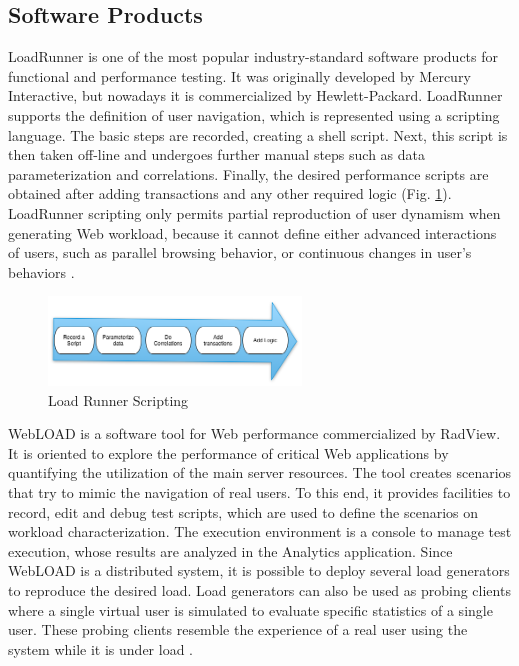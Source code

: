 \documentclass[espaco=umemeio,chapter=TITLE,twoside,openright]{abnt}
\begin{document}
\subsection{Software Products}

LoadRunner is one of the most popular industry-standard software products for functional and performance testing. It was originally developed by Mercury Interactive, but nowadays it is commercialized by Hewlett-Packard. LoadRunner supports the definition of user navigation, which is represented using a scripting language. The basic steps are recorded, creating a shell script. Next, this script is then taken off-line and undergoes further manual steps such as data parameterization and correlations. Finally, the desired performance scripts are obtained after adding transactions and any other required logic (Fig. \ref{fig:loadrunner}). LoadRunner scripting only permits partial reproduction of user dynamism when generating Web workload, because it cannot define either advanced interactions of users, such as parallel browsing behavior, or continuous changes in user’s behaviors \cite{MohammadS.Obaidat}.

\begin{figure}[!ht]
\centering
\includegraphics[width=0.6\textwidth]{./images/loadrunner.png}
\caption{Load Runner Scripting}
\label{fig:loadrunner}
\end{figure}



WebLOAD is a software tool for Web performance commercialized by RadView. It is oriented to explore the performance of critical Web applications by quantifying the utilization of the main server resources. The tool creates scenarios that try to mimic the navigation of real users. To this end, it provides facilities to record, edit and debug test scripts, which are used to define the scenarios on workload characterization. The execution environment is a console to manage test execution, whose results are analyzed in the Analytics application. Since WebLOAD is a distributed system, it is possible to deploy several load generators to reproduce the desired load. Load generators can also be used as probing clients where a single virtual user is simulated to evaluate specific statistics of a single user. These probing clients resemble the experience of a real user using the system while it is under load \cite{MohammadS.Obaidat}.
\end{document}

